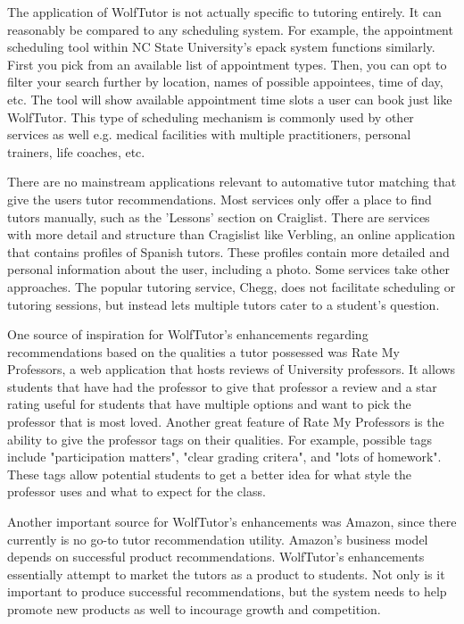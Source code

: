 The application of WolfTutor is not actually specific to tutoring entirely.
It can reasonably be compared to any scheduling system.
For example, the appointment scheduling tool within NC State University's epack system functions similarly.
First you pick from an available list of appointment types. Then, you can opt to filter your search further by location, names of possible appointees, time of day, etc.
The tool will show available appointment time slots a user can book just like WolfTutor.
This type of scheduling mechanism is commonly used by other services as well e.g. medical facilities with multiple practitioners, personal trainers, life coaches, etc.

There are no mainstream applications relevant to automative tutor matching that give the users tutor recommendations. 
Most services only offer a place to find tutors manually, such as the 'Lessons' section on Craiglist. \cite{RefWorks:doc:5abd46a5e4b0770b05a4080c} 
There are services with more detail and structure than Cragislist like Verbling, an online application that contains profiles of Spanish tutors. 
These profiles contain more detailed and personal information about the user, including a photo. \cite{RefWorks:doc:5abd466ce4b0689719ee9277} 
Some services take other approaches. 
The popular tutoring service, Chegg, does not facilitate scheduling or tutoring sessions, but instead lets multiple tutors cater to a student's question. \cite{RefWorks:doc:5abd45f7e4b0770b05a407c4}

One source of inspiration for WolfTutor's enhancements regarding recommendations 
based on the qualities a tutor possessed was Rate My Professors, a web application that hosts reviews of University professors. 
It allows students that have had the professor to give that professor a review and a star rating useful for
students that have multiple options and want to pick the professor that is most loved. Another great
feature of Rate My Professors is the ability to give the professor tags on their qualities. For example, possible tags
include "participation matters", "clear grading critera", and "lots of homework". \cite{rate-my-prof} These tags allow potential students to
get a better idea for what style the professor uses and what to expect for the class.

Another important source for WolfTutor's enhancements was Amazon, since there currently is 
no go-to tutor recommendation utility.\cite{amazon} Amazon's business model depends on successful product recommendations.
WolfTutor's enhancements essentially attempt to market the tutors as a product to students. Not only is it important
to produce successful recommendations, but the system needs to help promote new products as well to incourage 
growth and competition.



